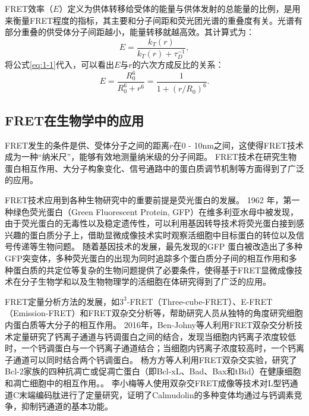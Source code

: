 FRET效率（$E$）定义为供体转移给受体的能量与供体发射的总能量的比例，是用来衡量FRET程度的指标，其主要和分子间距和荧光团光谱的重叠度有关。光谱有部分重叠的供受体分子间距越小，能量转移就越高效。其计算式为：
\begin{equation}
    {E}=\frac{k_T(r)}{k_T(r)+\tau^{-1}_{D}},
\end{equation}
将公式\ref{eq:1-1}代入，可以看出$E$与$r$的六次方成反比的关系：
\begin{equation}
    E=\frac{R_0^6}{R_0^6+r^6}=\frac{1}{1+(r/R_0)^6}.
\end{equation}

\subsection{FRET在生物学中的应用}

FRET发生的条件是供、受体分子之间的距离$r$在0 - 10nm之间，这使得FRET技术成为一种“纳米尺”，能够有效地测量纳米级的分子间距。
FRET技术在研究生物蛋白相互作用、大分子构象变化、信号通路中的蛋白质调节机制等方面得到了广泛的应用。

FRET技术应用到各种生物研究中的重要前提是荧光蛋白的发展。
1962 年，第一种绿色荧光蛋白（Green Fluorescent Protein, GFP）在维多利亚水母中被发现，由于荧光蛋白的无毒性以及稳定遗传性，可以利用基因转导技术将荧光蛋白接到感兴趣的蛋白质分子上，借助显微成像技术实时观察活细胞中目标蛋白的转位以及信号传递等生物问题。
随着基因技术的发展，最先发现的GFP 蛋白被改造出了多种GFP突变体，多种荧光蛋白的出现为同时追踪多个蛋白质分子间的相互作用和多种蛋白质的共定位等复杂的生物问题提供了必要条件，使得基于FRET显微成像技术在分子生物学和以及生物物理学的活细胞在体研究得到了广泛的应用。

FRET定量分析方法的发展，如$3^3$-FRET（Three-cube-FRET）、E-FRET（Emission-FRET）和FRET双杂交分析等，帮助研究人员从独特的角度研究细胞内蛋白质等大分子的相互作用。
2016年，Ben-Johny等人利用FRET双杂交分析技术定量研究了钙离子通道与钙调蛋白之间的结合，发现当细胞内钙离子浓度较低时，一个钙调蛋白与一个钙离子通道结合；当细胞内钙离子浓度较高时，一个钙离子通道可以同时结合两个钙调蛋白。
杨方方等人利用FRET双杂交实验，研究了Bcl-2家族的四种抗凋亡或促凋亡蛋白（即Bcl-xL、Bad、Bax和tBid）在健康细胞和凋亡细胞中的相互作用。。
李小梅等人使用双杂交FRET成像等技术对L型钙通道C末端编码肽进行了定量研究，证明了Calmudolin的多种变体均通过与钙调素竞争，抑制钙通道的基本功能。

